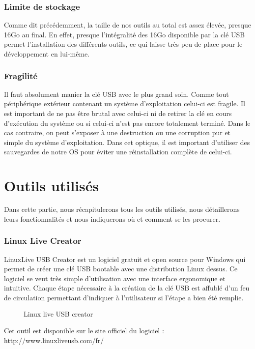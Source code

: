 \documentclass[final]{polytech/polytech}
\begin{document}
\section{Limite de stockage}
Comme dit précédemment, la taille de nos outils au total est assez élevée, presque 16Go au final. En effet, presque l’intégralité des 16Go disponible par la clé USB permet l’installation des différents outils, ce qui laisse très peu de place pour le développement en lui-même.

\section{Fragilité}
Il faut absolument manier la clé USB avec le plus grand soin. Comme tout périphérique extérieur contenant un système d’exploitation celui-ci est fragile. Il est important de ne pas être brutal avec celui-ci ni de retirer la clé en cours d’exécution du système ou si celui-ci n’est pas encore totalement terminé. Dans le cas contraire, on peut s’exposer à une destruction ou une corruption pur et simple du système d’exploitation. Dans cet optique, il est important d’utiliser des sauvegardes de notre OS pour éviter une réinstallation complète de celui-ci.

\part{Outils utilisés} %
Dans cette partie, nous récapitulerons tous les outils utilisés, nous détaillerons leurs fonctionnalités et nous indiquerons où et comment se les procurer.

\section{Linux Live Creator}
LinuxLive USB Creator est un logiciel gratuit et open source pour Windows qui permet de créer une clé USB bootable avec une distribution Linux dessus. Ce logiciel se veut très simple d’utilisation avec une interface ergonomique et intuitive. Chaque étape nécessaire à la création de la clé USB est affublé d’un feu de circulation permettant d’indiquer à l’utilisateur si l’étape a bien été remplie.

\begin{figure}
	\caption{Linux live USB creator}
	\label{fig:lili_usb_creator}
\end{figure}

Cet outil est disponible sur le site officiel du logiciel :
http://www.linuxliveusb.com/fr/
\end{document}
